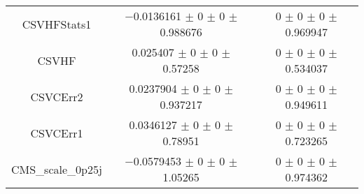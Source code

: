 \begin{table}
\begin{tabular}{ccc}
CSVHFStats1 & \num{-0.0136161} $\pm$ \num{0} $\pm$ \num{0} $\pm$ \num{0.988676} & \num{0} $\pm$ \num{0} $\pm$ \num{0} $\pm$ \num{0.969947}\\
CSVHF & \num{0.025407} $\pm$ \num{0} $\pm$ \num{0} $\pm$ \num{0.57258} & \num{0} $\pm$ \num{0} $\pm$ \num{0} $\pm$ \num{0.534037}\\
CSVCErr2 & \num{0.0237904} $\pm$ \num{0} $\pm$ \num{0} $\pm$ \num{0.937217} & \num{0} $\pm$ \num{0} $\pm$ \num{0} $\pm$ \num{0.949611}\\
CSVCErr1 & \num{0.0346127} $\pm$ \num{0} $\pm$ \num{0} $\pm$ \num{0.78951} & \num{0} $\pm$ \num{0} $\pm$ \num{0} $\pm$ \num{0.723265}\\
CMS\_scale\_0p25j & \num{-0.0579453} $\pm$ \num{0} $\pm$ \num{0} $\pm$ \num{1.05265} & \num{0} $\pm$ \num{0} $\pm$ \num{0} $\pm$ \num{0.974362}\\
\bottomrule
\end{tabular}
\end{table}